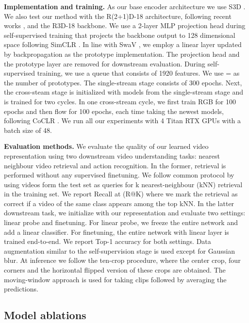 \documentclass[10pt,twocolumn,letterpaper]{article}
\begin{document}
\textbf{Implementation and training.} As our base encoder architecture we use S3D \cite{xie_rethinking_2018}. We also test our method with the R(2+1)D-18 \cite{tran_closer_2018} architecture, following recent works \cite{asano_labelling_2020, crasto_mars_2019}, and the R3D-18 \cite{hara_can_2018} backbone. We use a 2-layer MLP projection head during self-supervised training that projects the backbone output to 128 dimensional space following SimCLR \cite{chen_simple_2020}. In line with SwaV \cite{caron_unsupervised_2020}, we employ a linear layer updated by backpropagation as the prototype implementation. The projection head and the prototype layer are removed for downstream evaluation. During self-supervised training, we use a queue that consists of 1920 features. We use = as the number of prototypes. The single-stream stage consists of 300 epochs. Next, the cross-steam stage is initialized with models from the single-stream stage and is trained for two cycles. In one cross-stream cycle, we first train RGB for 100 epochs and then flow for 100 epochs, each time taking the newest models, following CoCLR \cite{han_self-supervised_2020}. We run all our experiments with 4 Titan RTX GPUs with a batch size of 48. 

\textbf{Evaluation methods.} We evaluate the quality of our learned video representation using two downstream video understanding tasks: nearest neighbour video retrieval and action recognition. In the former, retrieval is performed without any supervised finetuning. We follow common protocol \cite{misra_self-supervised_2020, buchler_improving_2018, xu_self-supervised_2019} by using videos form the test set as queries for k nearest-neighbour (kNN) retrieval in the training set. We report Recall at  (R@K) where we mark the retrieval as correct if a video of the same class appears among the top kNN. In the latter downstream task, we initialize with our representation and evaluate two settings: linear probe and finetuning. For linear probe, we freeze the entire network and add a linear classifier. For finetuning, the entire network with linear layer is trained end-to-end. We report Top-1 accuracy for both settings. Data augmentation similar to the self-supervision stage is used except for Gaussian blur. At inference we follow the ten-crop procedure, where the center crop, four corners and the horizontal flipped version of these crops are obtained. The moving-window approach is used for taking clips followed by averaging the predictions. 

\subsection{Model ablations}
\label{sec:ablation}
\end{document}
